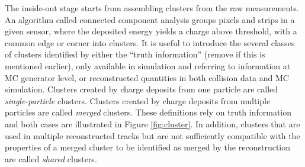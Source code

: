The inside-out stage starts from assembling clusters from the raw measurements.
An algorithm called connected component analysis \cite{CCA} 
groups pixels and strips in a given sensor, 
where the deposited energy yields a charge above threshold, 
with a common edge or corner into clusters. 
It is useful to introduce the several classes of clusters identified 
by either the ``truth information'' (remove if this is mentioned earlier), 
only available in simulation and referring to information at MC generator level, 
or reconstructed quantities in both collision data and MC simulation. 
Clusters created by charge deposits from one particle
are called \textit{single-particle} clusters. Clusters created by charge
deposits from multiple particles are called \textit{merged} clusters.
These definitions rely on truth information and both cases
are illustrated in Figure \ref{fig:cluster}. 
In addition, clusters that are used in multiple reconstructed tracks 
but are not sufficiently compatible with the properties of a merged cluster
to be identified as merged by the reconstruction are called \textit{shared} clusters.
